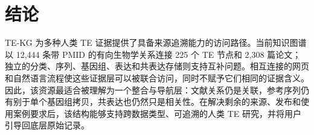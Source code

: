 \section{结论}

TE-KG 为多种人类 TE 证据提供了具备来源追溯能力的访问路径。当前知识图谱以 12,444 条带 PMID 的有向生物学关系连接 225 个 TE 节点和 2,308 篇论文；独立的分类、序列、基因组、表达和共表达存储则支持互补问题。相互连接的网页和自然语言流程使这些证据层可以被联合访问，同时不赋予它们相同的证据含义。因此，该资源最适合被理解为一个整合与导航层：文献关系仍是关联，参考序列仍有别于单个基因组拷贝，共表达也仍然只是相关性。在解决剩余的来源、发布和使用案例要求后，该结构能够支持跨数据类型、可追溯的人类 TE 研究，并将用户引导回底层原始记录。
